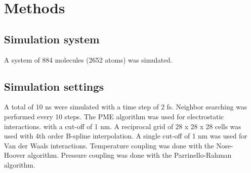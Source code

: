\section{Methods}
\subsection{Simulation system}
A system of 884 molecules (2652 atoms) was simulated.

\subsection{Simulation settings}
A total of 10 ns were simulated with a time step of 2 fs.
Neighbor searching was performed every 10 steps.
The PME algorithm was used for electrostatic interactions.
with a cut-off of 1 nm.
A reciprocal grid of 28 x 28 x 28 cells was used with 4th order B-spline interpolation.
A single cut-off of 1 nm was used for Van der Waals interactions.
Temperature coupling was done with the Nose-Hoover algorithm.
Pressure coupling was done with the Parrinello-Rahman algorithm.
